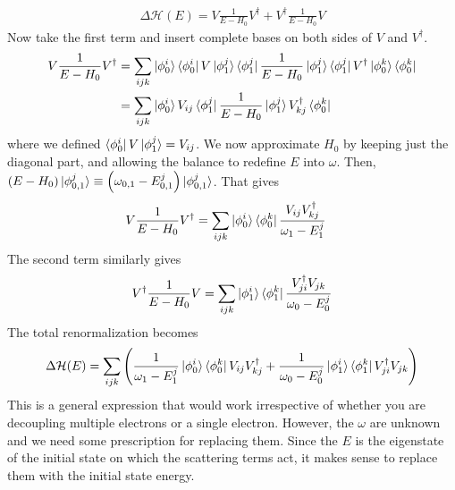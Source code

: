 \documentclass[twoside,11pt]{report}
\numberwithin{equation}{section}
\begin{document}
\begin{equation}\begin{aligned}
\Delta \mathcal{H}(E) = V\frac{1}{E - H_0}V^\dagger +  V^\dagger\frac{1}{E - H_0}V
\end{aligned}\end{equation}
Now take the first term and insert complete bases on both sides of \(V\) and \(V^\dagger\).
\begin{equation}\begin{aligned}
V\frac{1}{E - H_0}V^\dagger &= \sum_{ijk}\ket{\phi_0^i}\bra{\phi_0^i}V\ket{\phi_1^j}\bra{\phi_1^j}\frac{1}{E - H_0}\ket{\phi_1^j}\bra{\phi_1^j}V^\dagger\ket{\phi_0^k}\bra{\phi_0^k} \\
                &= \sum_{ijk}\ket{\phi_0^i}V_{ij}\bra{\phi_1^j}\frac{1}{E - H_0}\ket{\phi_1^j}V^\dagger_{kj}\bra{\phi_0^k}\\
\end{aligned}\end{equation}
where we defined \(\bra{\phi_0^i}V\ket{\phi_1^j} = V_{ij}\). We now approximate \(H_0\) by keeping just the diagonal part, and allowing the balance to redefine \(E\) into \(\omega\). Then, \(\left(E - H_0\right) \ket{\phi_{0,1}^j} \equiv \left(\omega_{0,1} - E_{0,1}^j\right) \ket{\phi_{0,1}^j}\). That gives
\begin{equation}\begin{aligned}
\label{pms_dropV}
V\frac{1}{E - H_0}V^\dagger &= \sum_{ijk}\ket{\phi_0^i}\bra{\phi_0^k}\frac{V_{ij}V^\dagger_{kj}}{\omega_1 - E^j_1}
\end{aligned}\end{equation}
The second term similarly gives
\begin{equation}\begin{aligned}
V^\dagger\frac{1}{E - H_0}V = \sum_{ijk}\ket{\phi_1^i}\bra{\phi_1^k}\frac{V^\dagger_{ji}V_{jk}}{\omega_0 - E^j_0}
\end{aligned}\end{equation}
The total renormalization becomes
\begin{equation}\begin{aligned}
	\Delta \mathcal{H}(E) = \sum_{ijk}\left(\frac{1}{\omega_1 - E^j_1}\ket{\phi_0^i}\bra{\phi_0^k}V_{ij}V^\dagger_{kj} + \frac{1}{\omega_0 - E^j_0}\ket{\phi_1^i}\bra{\phi_1^k}V^\dagger_{ji}V_{jk}\right)
\end{aligned}\end{equation}
This is a general expression that would work irrespective of whether you are decoupling multiple electrons or a single electron. However, the \(\omega\) are unknown and we need some prescription for replacing them. Since the \(E\) is the eigenstate of the initial state on which the scattering terms act, it makes sense to replace them with the initial state energy.
\end{document}
